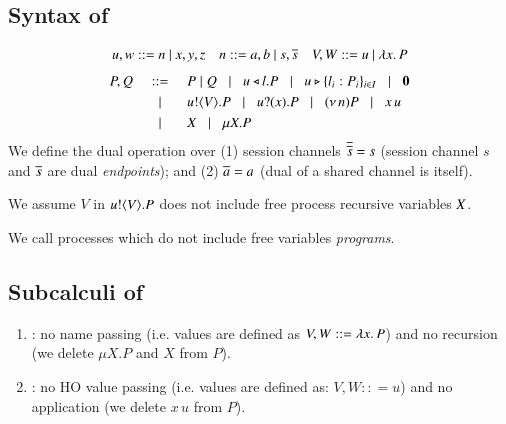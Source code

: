 \subsection{Syntax of \HOp}
\label{subsec:syntax}
\[ 
\begin{array}{lll}
u,w  ::=  n \ | \ x,y,z
& n ::= a,b  \ | \ s, \overline{s} 
& V,W  ::=   u \ | \ \lambda x.\,P
\end{array}
\]
\[
\begin{array}{rclllll}
P,Q & ::= &  P\;|\; Q \;\;\;|\;\;\; 
 u \triangleleft l . P \;\;\;|\;\;\; u \triangleright \{l_i:P_i\}_{i \in I} \;\;\;|\;\;\; \mathbf{0} \\[1mm]
  & \;\;\;|\;\;\; & u ! \langle V \rangle .{P} \;\;\;|\;\;\; u ? (x) .{P} \;\;\;|\;\;\; (\nu\, n) P 
\;\;\;|\;\;\; x\, {u} 
\\[1mm]
      & \;\;\;|\;\;\; & X \;\;\;|\;\;\; \mu X. P
\end{array}
\]
We define the dual operation over (1) session channels $\overline{\overline{s}} = s$
(session channel $s$ and $\overline{s}$ are dual \emph{endpoints}); and 
(2) $\overline{a} = a$ (dual of a shared channel is itself).  

We assume $V$ in $u ! \langle V \rangle .{P}$ does not include free process recursive 
variables $X$. 

We call processes which do not include free variables {\em programs}.

\subsection{Subcalculi of \HOp}
\label{subsec:subcalculi}
\begin{enumerate}[$\bullet$]
\item \HO: no name passing 
(i.e. values are defined as $V,W :: = \lambda x.\,P$)
and no recursion (we delete $\mu X.P$ and $X$ from $P$).   
\item \sessp: no HO value passing (i.e. 
values are defined as:
$V,W :: = u$) and no application (we delete $x\, u$ from $P$). 
\end{enumerate}

